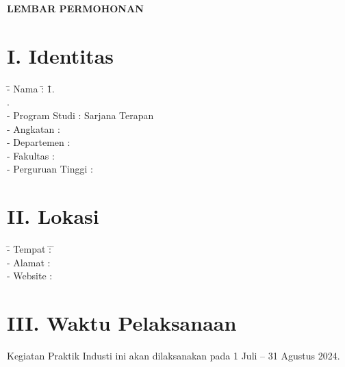 \newpage
\begin{center}
    \begin{doublespace}
        \textbf{\large \MakeUppercase{LEMBAR PERMOHONAN \\ \tipe}}
    \end{doublespace}
\end{center}

\section*{I. Identitas}

\begin{tabbing}
    \hspace{0.5em} \= {- Nama} \hspace{5em} \= : \hspace{1em} \= 1. {\penulisPertama} \\
    \> \> . {\penulisKedua} \\
    \> {- Program Studi} \> : \> Sarjana Terapan {\prodi} \\ 
    \> {- Angkatan} \> :  \\
    \> {- Departemen} \> : \> {\departemen} \\
    \> {- Fakultas} \> : \> {\fakultas} \\
    \> {- Perguruan Tinggi} \> : \> {\universitas} \\
\end{tabbing}

\vspace{1em}

\section*{II. Lokasi}

\begin{tabbing}
    \hspace{0.5em} \= {- Tempat} \hspace{1em} \= : \hspace{1em} \= {\perusahaan} \\
    \> {- Alamat} \> : \> {\alamatPerusahaan} \\ 
    \> {- Website} \> : \> \texttt{\href{\websitePerusahaan}{\websitePerusahaan}} \\
\end{tabbing}


\section*{III. Waktu Pelaksanaan}

Kegiatan Praktik Industi ini akan dilaksanakan pada 1 Juli – 31 Agustus 2024.

